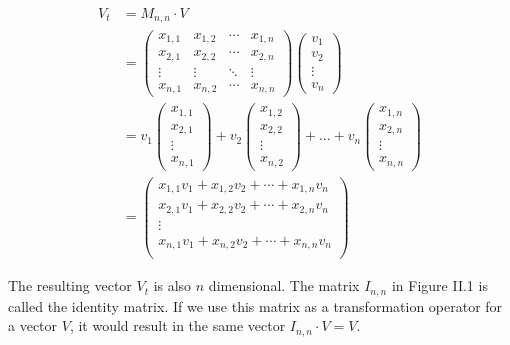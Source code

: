 \begin{equation}\begin{aligned}V_t &= M_{n,n} \cdot V \\ &= \begin{pmatrix}
  x_{1,1} & x_{1,2} & \cdots & x_{1,n} \\
  x_{2,1} & x_{2,2} & \cdots & x_{2,n} \\
  \vdots  & \vdots  & \ddots & \vdots  \\
  x_{n,1} & x_{n,2} & \cdots & x_{n,n}
 \end{pmatrix} \begin{pmatrix} v_1 \\ v_2 \\ \vdots \\ v_n \end{pmatrix} \\ &= v_1\begin{pmatrix}
  x_{1,1} \\ x_{2,1} \\ \vdots \\ x_{n,1} \end{pmatrix} + v_2\begin{pmatrix}
  x_{1,2} \\ x_{2,2} \\ \vdots \\ x_{n,2} \end{pmatrix} + ... + v_n\begin{pmatrix}
  x_{1,n} \\ x_{2,n} \\ \vdots \\ x_{n,n} \end{pmatrix} \\ &= \begin{pmatrix}
  x_{1,1} v_1 + x_{1,2} v_2 + \cdots + x_{1,n} v_n  \\
  x_{2,1} v_1 + x_{2,2} v_2 + \cdots + x_{2,n} v_n  \\
  \vdots \\
  x_{n,1} v_1 + x_{n,2} v_2 + \cdots + x_{n,n} v_n  \\
 \end{pmatrix}\end{aligned}\tag{II.2}\end{equation}

The resulting vector \(V_t\) is also \(n\) dimensional. The matrix \(I_{n, n}\) in Figure II.1 is called the identity matrix. If we use this matrix as a transformation operator for a vector \(V\), it would result in the same vector \(I_{n,n} \cdot V = V\).


